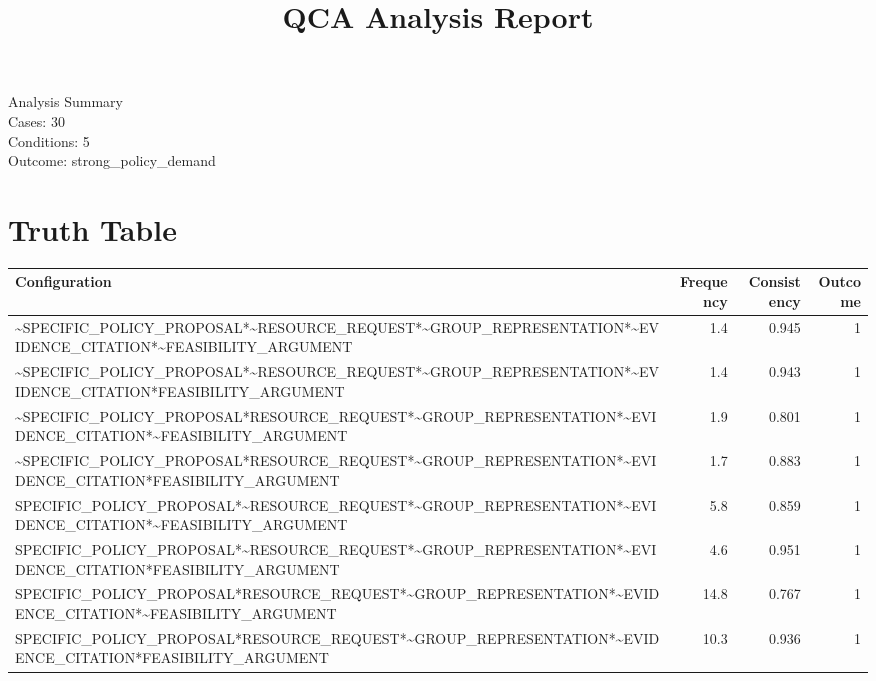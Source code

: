 \documentclass[12pt,a4paper]{article}
\title{QCA Analysis Report}
\begin{document}
\maketitle
\begin{center}
\large
Analysis Summary \\
Cases: 30 \\
Conditions: 5 \\
Outcome: strong\_policy\_demand
\end{center}
\newpage

\tableofcontents

\newpage


\section{Truth Table}
\begin{longtable}{lrrr}
\toprule
Configuration & Frequency & Consistency & Outcome \\
\midrule
    \textasciitilde{}SPECIFIC\_POLICY\_PROPOSAL*\textasciitilde{}RESOURCE\_REQUEST*\textasciitilde{}GROUP\_REPRESENTATION*\textasciitilde{}EVIDENCE\_CITATION*\textasciitilde{}FEASIBILITY\_ARGUMENT & 1.4 & 0.945 & 1 \\
    \textasciitilde{}SPECIFIC\_POLICY\_PROPOSAL*\textasciitilde{}RESOURCE\_REQUEST*\textasciitilde{}GROUP\_REPRESENTATION*\textasciitilde{}EVIDENCE\_CITATION*FEASIBILITY\_ARGUMENT & 1.4 & 0.943 & 1 \\
    \textasciitilde{}SPECIFIC\_POLICY\_PROPOSAL*RESOURCE\_REQUEST*\textasciitilde{}GROUP\_REPRESENTATION*\textasciitilde{}EVIDENCE\_CITATION*\textasciitilde{}FEASIBILITY\_ARGUMENT & 1.9 & 0.801 & 1 \\
    \textasciitilde{}SPECIFIC\_POLICY\_PROPOSAL*RESOURCE\_REQUEST*\textasciitilde{}GROUP\_REPRESENTATION*\textasciitilde{}EVIDENCE\_CITATION*FEASIBILITY\_ARGUMENT & 1.7 & 0.883 & 1 \\
    SPECIFIC\_POLICY\_PROPOSAL*\textasciitilde{}RESOURCE\_REQUEST*\textasciitilde{}GROUP\_REPRESENTATION*\textasciitilde{}EVIDENCE\_CITATION*\textasciitilde{}FEASIBILITY\_ARGUMENT & 5.8 & 0.859 & 1 \\
    SPECIFIC\_POLICY\_PROPOSAL*\textasciitilde{}RESOURCE\_REQUEST*\textasciitilde{}GROUP\_REPRESENTATION*\textasciitilde{}EVIDENCE\_CITATION*FEASIBILITY\_ARGUMENT & 4.6 & 0.951 & 1 \\
    SPECIFIC\_POLICY\_PROPOSAL*RESOURCE\_REQUEST*\textasciitilde{}GROUP\_REPRESENTATION*\textasciitilde{}EVIDENCE\_CITATION*\textasciitilde{}FEASIBILITY\_ARGUMENT & 14.8 & 0.767 & 1 \\
    SPECIFIC\_POLICY\_PROPOSAL*RESOURCE\_REQUEST*\textasciitilde{}GROUP\_REPRESENTATION*\textasciitilde{}EVIDENCE\_CITATION*FEASIBILITY\_ARGUMENT & 10.3 & 0.936 & 1 \\
\bottomrule
\end{longtable}
\end{document}
